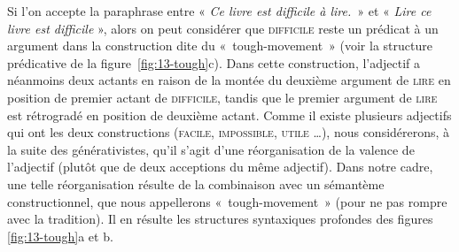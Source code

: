 { Si l’on accepte la paraphrase entre « \textit{Ce livre est difficile à lire.}~» et « \textit{Lire ce livre est difficile} », alors on peut considérer que \textsc{difficile} reste un prédicat à un argument dans la construction dite du «~tough-movement~» (voir la structure prédicative de la figure~\ref{fig:13-tough}c). Dans cette construction, l'adjectif a néanmoins deux actants en raison de la montée du deuxième argument de \textsc{lire} en position de premier actant de \textsc{difficile}, tandis que le premier argument de \textsc{lire} est rétrogradé en position de deuxième actant. Comme il existe plusieurs adjectifs qui ont les deux constructions (\textsc{facile}, \textsc{impossible}, \textsc{utile} …), nous considérerons, à la suite des générativistes, qu’il s’agit d’une réorganisation de la valence de l’adjectif (plutôt que de deux acceptions du même adjectif). Dans notre cadre, une telle réorganisation résulte de la combinaison avec un sémantème constructionnel, que nous appellerons «~{tough-movement}~» (pour ne pas rompre avec la tradition). Il en résulte les structures syntaxiques profondes des figures \ref{fig:13-tough}a et b.

}
